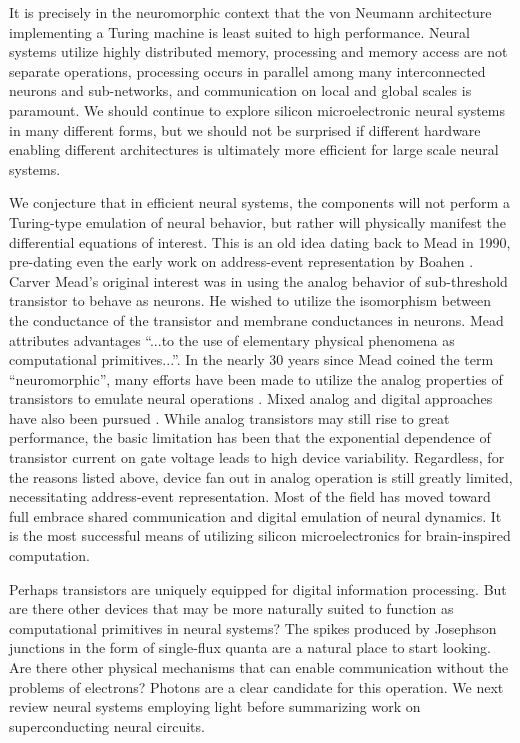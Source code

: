 \documentclass[twocolumn]{article}
\begin{document}
It is precisely in the neuromorphic context that the von Neumann architecture implementing a Turing machine is least suited to high performance. Neural systems utilize highly distributed memory, processing and memory access are not separate operations, processing occurs in parallel among many interconnected neurons and sub-networks, and communication on local and global scales is paramount. We should continue to explore silicon microelectronic neural systems in many different forms, but we should not be surprised if different hardware enabling different architectures is ultimately more efficient for large scale neural systems. 

We conjecture that in efficient neural systems, the components will not perform a Turing-type emulation of neural behavior, but rather will physically manifest the differential equations of interest. This is an old idea \cite{me1990} dating back to Mead in 1990, pre-dating even the early work on address-event representation by Boahen \cite{bo2000}. Carver Mead's original interest was in using the analog behavior of sub-threshold transistor to behave as neurons. He wished to utilize the isomorphism between the conductance of the transistor and membrane conductances in neurons. Mead attributes advantages ``...to the use of elementary physical phenomena as computational primitives...''. In the nearly 30 years since Mead coined the term ``neuromorphic'', many efforts have been made to utilize the analog properties of transistors to emulate neural operations \cite{hama2013}. Mixed analog and digital approaches have also been pursued \cite{}. While analog transistors may still rise to great performance, the basic limitation has been that the exponential dependence of transistor current on gate voltage leads to high device variability. Regardless, for the reasons listed above, device fan out in analog operation is still greatly limited, necessitating address-event representation. Most of the field has moved toward full embrace shared communication and digital emulation of neural dynamics. It is the most successful means of utilizing silicon microelectronics for brain-inspired computation.

Perhaps transistors are uniquely equipped for digital information processing. But are there other devices that may be more naturally suited to function as computational primitives in neural systems? The spikes produced by Josephson junctions in the form of single-flux quanta are a natural place to start looking. Are there other physical mechanisms that can enable communication without the problems of electrons? Photons are a clear candidate for this operation. We next review neural systems employing light before summarizing work on superconducting neural circuits.
\end{document}
